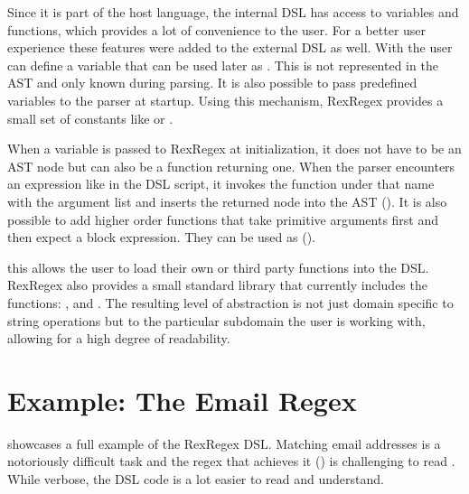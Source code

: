 Since it is part of the host language, the internal DSL has access to variables and functions, which provides a lot of convenience to the user. For a better user experience these features were added to the external DSL as well. With  the user can define a variable that can be used later as . This is not represented in the AST and only known during parsing. It is also possible to pass predefined variables  to the parser at startup. Using this mechanism, RexRegex provides a small set of constants like  or . 

When a variable is passed to RexRegex at initialization, it does not have to be an AST node but can also be a function returning one. When the parser encounters an expression like  in the DSL script, it invokes the function under that name with the argument list and inserts the returned node into the AST (). It is also possible to add higher order functions  that take primitive arguments first and then expect a block expression. They can be used as  ().

this allows the user to load their own or third party functions into the DSL. RexRegex also provides a small standard library that currently includes the functions: ,  and . The resulting level of abstraction is not just domain specific to string operations but to the particular subdomain the user is working with, allowing for a high degree of readability.

\section{Example: The Email Regex}

 showcases a full example of the RexRegex DSL. Matching email addresses is a notoriously difficult task and the regex that achieves it () is challenging to read \cite{EmailRegex}. While verbose, the DSL code is a lot easier to read and understand.

